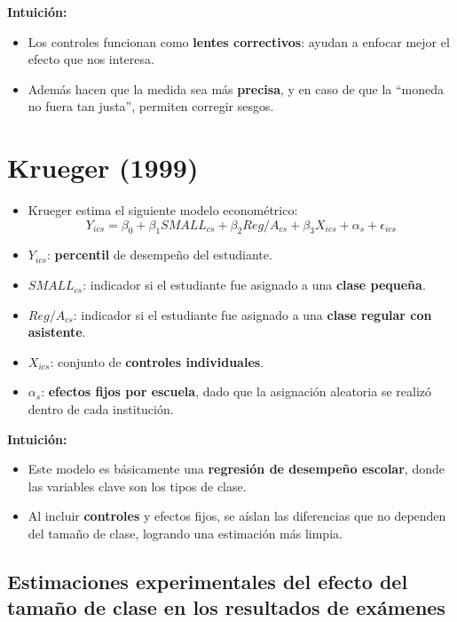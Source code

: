 \documentclass[12pt]{article}
\begin{document}
\textbf{Intuición:}
\begin{itemize}
    \item Los controles funcionan como \textbf{lentes correctivos}: ayudan a enfocar mejor el efecto que nos interesa.
    \item Además hacen que la medida sea más \textbf{precisa}, y en caso de que la “moneda no fuera tan justa”, permiten corregir sesgos.
\end{itemize}

\section*{\noindent\textbf{Krueger (1999)}}

\begin{itemize}
    \item Krueger estima el siguiente modelo econométrico:
    \[
    Y_{ics} = \beta_0 + \beta_1 SMALL_{cs} + \beta_2 Reg/A_{cs} + \beta_3 X_{ics} + \alpha_s + \epsilon_{ics}
    \]
    \item $Y_{ics}$: \textbf{percentil} de desempeño del estudiante.
    \item $SMALL_{cs}$: indicador si el estudiante fue asignado a una \textbf{clase pequeña}.
    \item $Reg/A_{cs}$: indicador si el estudiante fue asignado a una \textbf{clase regular con asistente}.
    \item $X_{ics}$: conjunto de \textbf{controles individuales}.
    \item $\alpha_s$: \textbf{efectos fijos por escuela}, dado que la asignación aleatoria se realizó dentro de cada institución.
\end{itemize}

\textbf{Intuición:}
\begin{itemize}
    \item Este modelo es básicamente una \textbf{regresión de desempeño escolar}, donde las variables clave son los tipos de clase.
    \item Al incluir \textbf{controles} y efectos fijos, se aíslan las diferencias que no dependen del tamaño de clase, logrando una estimación más limpia.
\end{itemize}

\subsection*{\noindent\textbf{Estimaciones experimentales del efecto del tamaño de clase en los resultados de exámenes}}
\end{document}
